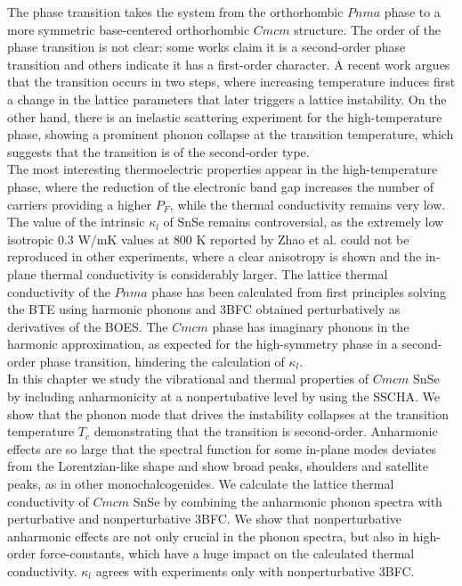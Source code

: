 The phase transition takes the system from the orthorhombic $Pnma$ phase to a more symmetric base-centered orthorhombic $Cmcm$ structure. The order of the phase transition is not clear: some works\cite{zhao2014ultralow,
adouby1998structure,chattopadhyay1986neutron,chatterji2018soft} claim it is a second-order phase transition and 
others\cite{von1981high} indicate it has a first-order character. A recent work\cite{dewandre2016two} argues that the transition occurs in 
two steps, where increasing temperature induces first a change in the lattice parameters that later triggers a 
lattice instability. On the other hand, there is an inelastic scattering experiment for the high-temperature 
phase, showing a prominent phonon collapse at the transition temperature, which suggests that the transition is 
of the second-order type\cite{chatterji2018soft}. \\

The most interesting thermoelectric properties appear in the high-temperature phase, where the reduction of the electronic band gap increases the number of carriers providing a higher $P_{F}$, while the thermal conductivity 
remains very low. The value of the intrinsic $\kappa_{l}$ of SnSe remains controversial, as the extremely low isotropic $0.3$ W/mK values at $800$ K reported by Zhao et al.\cite{zhao2014ultralow} could not be reproduced in 
other experiments, where a clear anisotropy is shown and the in-plane thermal conductivity is considerably larger\cite{ibrahim2017reinvestigation,sassi2014assessment,chen2014thermoelectric}. The lattice thermal conductivity 
of the $Pnma$ phase has been calculated\cite{carrete2014low,skelton2016anharmonicity} from first principles solving the BTE using harmonic phonons and 3BFC obtained perturbatively as derivatives of the BOES. The $Cmcm$ phase 
has imaginary phonons in the harmonic approximation\cite{dewandre2016two,skelton2016anharmonicity,yu2016enhanced}, as expected for the high-symmetry phase in a second-order phase transition, hindering the 
calculation of $\kappa_{l}$. \\

In this chapter we study the vibrational and thermal properties of $Cmcm$ SnSe by including anharmonicity at a nonpertubative level by using the SSCHA. We show that the phonon mode that drives the instability collapses at the 
transition temperature $T_{c}$ demonstrating that the transition is second-order. Anharmonic effects are so large that the spectral function for some in-plane modes deviates from the Lorentzian-like shape and show broad peaks, 
shoulders and satellite peaks, as in other monochalcogenides\cite{ribeiro2018strong,li2014phonon}. We calculate the lattice thermal conductivity of $Cmcm$ SnSe by combining the anharmonic phonon spectra with perturbative and 
nonperturbative 3BFC. We show that nonperturbative anharmonic effects are not only crucial in the phonon spectra, but also in high-order force-constants, which have a huge impact on the calculated thermal conductivity. 
$\kappa_{l}$ agrees with experiments\cite{ibrahim2017reinvestigation} only with nonperturbative 3BFC.

